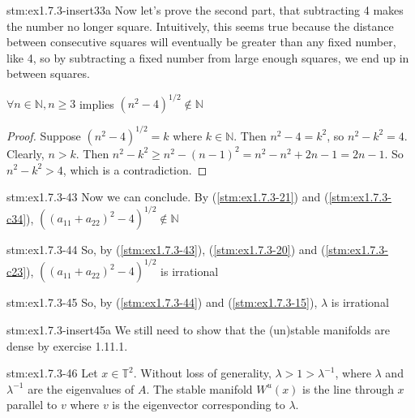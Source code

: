 \begin{explanation}{stm:ex1.7.3-insert33a}
Now let's prove the second part, that subtracting 4 makes the number no longer square. Intuitively, this seems true because the distance between consecutive squares will eventually be greater than any fixed number, like 4, so by subtracting a fixed number from large enough squares, we end up in between squares.
\end{explanation}

\begin{conj}\label{stm:ex1.7.3-c34}
$\forall n \in \mathbb{N}, n \ge 3$ implies $(n^2 - 4)^{1/2} \notin \mathbb{N}$
\end{conj}

\begin{proof}
Suppose $(n^2 - 4)^{1/2} = k$ where $k \in \mathbb{N}$. Then $n^2 - 4 = k^2$, so $n^2 - k^2 = 4$. Clearly, $n > k$. Then $n^2 - k^2 \ge n^2 - (n - 1)^2 = n^2 - n^2 + 2n - 1 = 2n - 1$. So $n^2 - k^2 > 4$, which is a contradiction.
\end{proof}

\begin{statement}{stm:ex1.7.3-43}
Now we can conclude. By (\ref{stm:ex1.7.3-21}) and (\ref{stm:ex1.7.3-c34}), $((a_{11} + a_{22})^2 - 4)^{1/2} \notin \mathbb{N}$
\end{statement}

\begin{statement}{stm:ex1.7.3-44}
So, by (\ref{stm:ex1.7.3-43}), (\ref{stm:ex1.7.3-20}) and (\ref{stm:ex1.7.3-c23}), $((a_{11} + a_{22})^2 - 4)^{1/2}$ is irrational
\end{statement}

\begin{statement}{stm:ex1.7.3-45}
So, by (\ref{stm:ex1.7.3-44}) and (\ref{stm:ex1.7.3-15}), $\lambda$ is irrational
\end{statement}

\begin{explanation}{stm:ex1.7.3-insert45a}
We still need to show that the (un)stable manifolds are dense by exercise 1.11.1.
\end{explanation}

\begin{statement}{stm:ex1.7.3-46}
Let $x \in \mathbb{T}^2$. Without loss of generality, $\lambda > 1 > \lambda^{-1}$, where $\lambda$ and $\lambda^{-1}$ are the eigenvalues of $A$. The stable manifold $W^u(x)$ is the line through $x$ parallel to $v$ where $v$ is the eigenvector corresponding to $\lambda$.
\end{statement}

